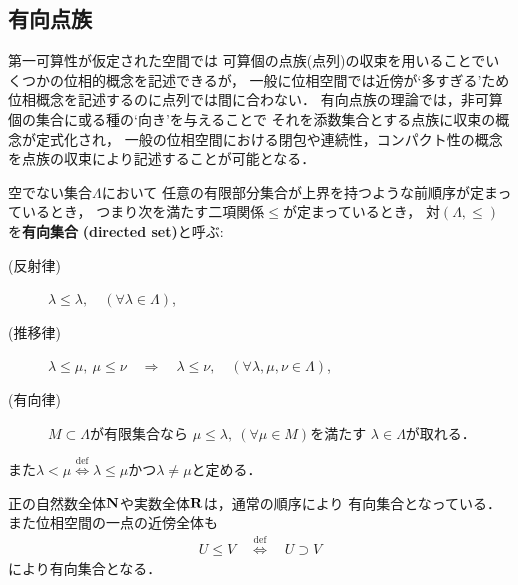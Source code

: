 \subsection{有向点族}
	第一可算性が仮定された空間では
	可算個の点族(点列)の収束を用いることでいくつかの位相的概念を記述できるが，
	一般に位相空間では近傍が`多すぎる'ため位相概念を記述するのに点列では間に合わない．
	有向点族の理論では，非可算個の集合に或る種の`向き'を与えることで
	それを添数集合とする点族に収束の概念が定式化され，
	一般の位相空間における閉包や連続性，コンパクト性の概念を点族の収束により記述することが可能となる．
	
	\begin{screen}
		\begin{dfn}[有向集合]
			空でない集合$\Lambda$において
			任意の有限部分集合が上界を持つような前順序が定まっているとき，
			つまり次を満たす二項関係$\leq$が定まっているとき，
			対$(\Lambda,\leq)$を{\bf 有向集合}
			{\bf (directed set)}と呼ぶ:
			\begin{description}
				\item[(反射律)] $\lambda \leq \lambda,\quad (\forall \lambda \in \Lambda)$,
				\item[(推移律)] $\lambda \leq \mu,\ \mu \leq \nu 
					\quad \Longrightarrow \quad \lambda \leq \nu,\quad 
					(\forall \lambda,\mu,\nu \in \Lambda)$,
				\item[(有向律)] 
					$M \subset \Lambda$が有限集合なら
					$\mu \leq \lambda,\ (\forall \mu \in M)$を満たす
					$\lambda \in \Lambda$が取れる．
			\end{description}
			また$\lambda < \mu \overset{\mathrm{def}}{\Longleftrightarrow} 
			\mbox{$\lambda \leq \mu$かつ$\lambda \neq \mu$}$と定める．
		\end{dfn}
	\end{screen}
	正の自然数全体$\mathbf{N}$や実数全体$\mathbf{R}$は，通常の順序により
	有向集合となっている．また位相空間の一点の近傍全体も
	\begin{align}
		U \leq V \quad \overset{\mathrm{def}}{\Longleftrightarrow} \quad
		U \supset V
	\end{align}
	により有向集合となる．
	
